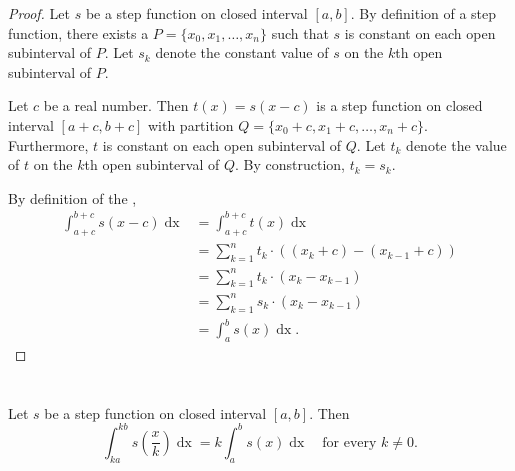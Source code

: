 \documentclass{report}
\begin{document}
\begin{proof}

  Let $s$ be a step function on closed interval $[a, b]$.
  By definition of a step function, there exists a 
    $P = \{x_0, x_1, \ldots, x_n\}$ such that $s$ is constant on each open
    subinterval of $P$.
  Let $s_k$ denote the constant value of $s$ on the $k$th open subinterval of
    $P$.

  Let $c$ be a real number.
  Then $t(x) = s(x - c)$ is a step function on closed interval $[a + c, b + c]$
    with partition $Q = \{x_0 + c, x_1 + c, \ldots, x_n + c\}$.
  Furthermore, $t$ is constant on each open subinterval of $Q$.
  Let $t_k$ denote the value of $t$ on the $k$th open subinterval of $Q$.
  By construction, $t_k = s_k$.

  By definition of the ,
    \begin{align*}
      \int_{a+c}^{b+c} s(x - c) \mathop{dx}
        & = \int_{a+c}^{b+c} t(x) \mathop{dx} \\
        & = \sum_{k=1}^n t_k \cdot ((x_k + c) - (x_{k - 1} + c)) \\
        & = \sum_{k=1}^n t_k \cdot (x_k - x_{k - 1}) \\
        & = \sum_{k=1}^n s_k \cdot (x_k - x_{k - 1}) \\
        & = \int_a^b s(x) \mathop{dx}.
    \end{align*}

\end{proof}

\section{}%
\label{sec:step-expansion-contraction-interval-integration}
\label{sec:theorem-1.8}

\begin{theorem}{1.8}

  Let $s$ be a step function on closed interval $[a, b]$.
  Then
    $$\int_{ka}^{kb} s \left( \frac{x}{k} \right) \mathop{dx} =
      k \int_a^b s(x) \mathop{dx} \quad\text{for every } k \neq 0.$$

\end{theorem}
\end{document}
